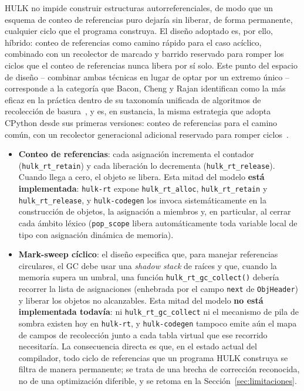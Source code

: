 \documentclass[12pt, a4paper]{article}
\begin{document}
HULK no impide construir estructuras autorreferenciales, de modo que un
esquema de conteo de referencias puro dejaría sin liberar, de forma permanente,
cualquier ciclo que el programa construya. El dise\~{n}o adoptado es, por ello,
h\'{i}brido: conteo de referencias como camino r\'{a}pido para el caso ac\'{i}clico,
combinado con un recolector de marcado y barrido reservado para romper los
ciclos que el conteo de referencias nunca libera por s\'{i} solo. Este punto del
espacio de dise\~{n}o -- combinar ambas t\'{e}cnicas en lugar de optar por un
extremo \'{u}nico -- corresponde a la categor\'{i}a que Bacon, Cheng y Rajan
identifican como la m\'{a}s eficaz en la pr\'{a}ctica dentro de su taxonom\'{i}a
unificada de algoritmos de recolecci\'{o}n de basura~\cite{baconrajan2004}, y es,
en sustancia, la misma estrategia que adopta CPython desde sus primeras
versiones: conteo de referencias para el camino com\'{u}n, con un recolector
generacional adicional reservado para romper ciclos~\cite{baconrajan2001}.

\begin{itemize}
    \item \textbf{Conteo de referencias}: cada asignaci\'{o}n incrementa el contador
          (\texttt{hulk\_rt\_retain}) y cada liberaci\'{o}n lo decrementa
          (\texttt{hulk\_rt\_release}). Cuando llega a cero, el objeto se libera.
          Esta mitad del modelo \textbf{est\'{a} implementada}: \texttt{hulk-rt}
          expone \texttt{hulk\_rt\_alloc}, \texttt{hulk\_rt\_retain} y
          \texttt{hulk\_rt\_release}, y \texttt{hulk-codegen} los invoca
          sistem\'{a}ticamente en la construcci\'{o}n de objetos, la asignaci\'{o}n
          a miembros y, en particular, al cerrar cada \'{a}mbito l\'{e}xico
          (\texttt{pop\_scope} libera autom\'{a}ticamente toda variable local de
          tipo con asignaci\'{o}n din\'{a}mica de memoria).
    \item \textbf{Mark-sweep c\'{i}clico}: el dise\~{n}o especifica que, para
          manejar referencias circulares, el GC debe usar una \textit{shadow
          stack} de ra\'{i}ces y que, cuando la memoria supera un umbral,
          una funci\'{o}n \texttt{hulk\_rt\_gc\_collect()} deber\'{i}a recorrer
          la lista de asignaciones (enhebrada por el campo \texttt{next} de
          \texttt{ObjHeader}) y liberar los objetos no alcanzables. Esta
          mitad del modelo \textbf{no est\'{a} implementada todav\'{i}a}: ni
          \texttt{hulk\_rt\_gc\_collect} ni el mecanismo de pila de sombra
          existen hoy en \texttt{hulk-rt}, y \texttt{hulk-codegen} tampoco
          emite a\'{u}n el mapa de campos de recolecci\'{o}n junto a cada
          tabla virtual que ese recorrido necesitar\'{i}a. La consecuencia
          directa es que, en el estado actual del compilador, todo ciclo de
          referencias que un programa HULK construya se filtra de manera
          permanente; se trata de una brecha de correcci\'{o}n reconocida,
          no de una optimizaci\'{o}n diferible, y se retoma en la
          Secci\'{o}n~\ref{sec:limitaciones}.
\end{itemize}
\end{document}
